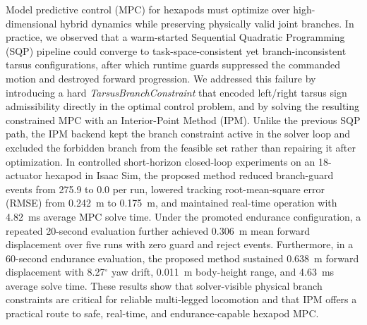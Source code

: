 Model predictive control (MPC) for hexapods must optimize over high-dimensional hybrid dynamics while preserving physically valid joint branches. In practice, we observed that a warm-started Sequential Quadratic Programming (SQP) pipeline could converge to task-space-consistent yet branch-inconsistent tarsus configurations, after which runtime guards suppressed the commanded motion and destroyed forward progression. We addressed this failure by introducing a hard \emph{TarsusBranchConstraint} that encoded left/right tarsus sign admissibility directly in the optimal control problem, and by solving the resulting constrained MPC with an Interior-Point Method (IPM). Unlike the previous SQP path, the IPM backend kept the branch constraint active in the solver loop and excluded the forbidden branch from the feasible set rather than repairing it after optimization. In controlled short-horizon closed-loop experiments on an 18-actuator hexapod in Isaac Sim, the proposed method reduced branch-guard events from 275.9 to 0.0 per run, lowered tracking root-mean-square error (RMSE) from 0.242~m to 0.175~m, and maintained real-time operation with 4.82~ms average MPC solve time. Under the promoted endurance configuration, a repeated 20-second evaluation further achieved 0.306~m mean forward displacement over five runs with zero guard and reject events. Furthermore, in a 60-second endurance evaluation, the proposed method sustained 0.638~m forward displacement with 8.27$^\circ$ yaw drift, 0.011~m body-height range, and 4.63~ms average solve time. These results show that solver-visible physical branch constraints are critical for reliable multi-legged locomotion and that IPM offers a practical route to safe, real-time, and endurance-capable hexapod MPC.
